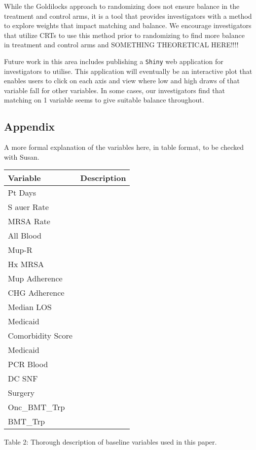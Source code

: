 \documentclass[]{sagej}
\begin{document}
While the Goldilocks approach to randomizing does not ensure balance in
the treatment and control arms, it is a tool that provides investigators
with a method to explore weights that impact matching and balance. We
encourage investigators that utilize CRTs to use this method prior to
randomizing to find more balance in treatment and control arms and
SOMETHING THEORETICAL HERE!!!!

Future work in this area includes publishing a \texttt{Shiny} web
application for investigators to utilise. This application will
eventually be an interactive plot that enables users to click on each
axis and view where low and high draws of that variable fall for other
variables. In some cases, our investigators find that matching on 1
variable seems to give suitable balance throughout.

\subsection{Appendix}\label{appendix}

A more formal explanation of the variables here, in table format, to be
checked with Susan.

\begin{longtable}[]{@{}ll@{}}
\toprule
Variable & Description\tabularnewline
\midrule
\endhead
Pt Days &\tabularnewline
S auer Rate &\tabularnewline
MRSA Rate &\tabularnewline
All Blood &\tabularnewline
Mup-R &\tabularnewline
Hx MRSA &\tabularnewline
Mup Adherence &\tabularnewline
CHG Adherence &\tabularnewline
Median LOS &\tabularnewline
Medicaid &\tabularnewline
Comorbidity Score &\tabularnewline
Medicaid &\tabularnewline
PCR Blood &\tabularnewline
DC SNF &\tabularnewline
Surgery &\tabularnewline
Onc\_BMT\_Trp &\tabularnewline
BMT\_Trp &\tabularnewline
\bottomrule
\end{longtable}

Table 2: Thorough description of baseline variables used in this paper.


\end{document}
